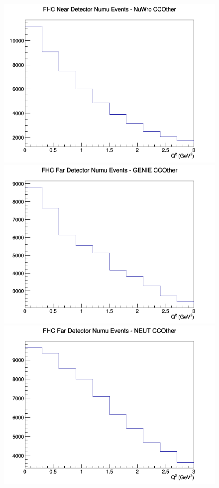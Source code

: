 \begin{figure}[h]
\includegraphics[width=\linewidth]{eff_Q2/GAr/CCOther_FHC_ND_numu_Q2_NuWro.png}
\endminipage
\newline
{}
\includegraphics[width=\linewidth]{eff_Q2/GAr/CCOther_FHC_FD_numu_Q2_GENIE.png}
\endminipage
{}
\includegraphics[width=\linewidth]{eff_Q2/GAr/CCOther_FHC_FD_numu_Q2_NEUT.png}

\end{figure}
